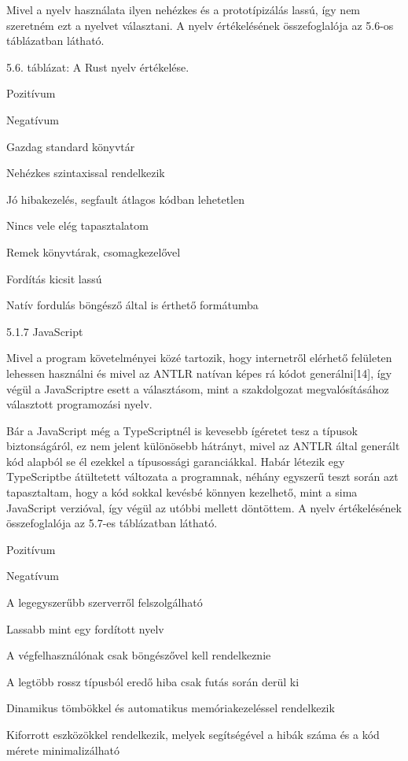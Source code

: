 Mivel a nyelv használata ilyen nehézkes és a prototípizálás lassú, így nem szeretném ezt a nyelvet választani. A nyelv értékelésének összefoglalója az 5.6-os táblázatban látható.

5.6. táblázat: A Rust nyelv értékelése.

Pozitívum

Negatívum

Gazdag standard könyvtár

Nehézkes szintaxissal rendelkezik

Jó hibakezelés, segfault átlagos kódban lehetetlen

Nincs vele elég tapasztalatom

Remek könyvtárak, csomagkezelővel

Fordítás kicsit lassú

Natív fordulás böngésző által is érthető formátumba





5.1.7 JavaScript

Mivel a program követelményei közé tartozik, hogy internetről elérhető felületen lehessen használni és mivel az ANTLR natívan képes rá kódot generálni[14], így végül a JavaScriptre esett a választásom, mint a szakdolgozat megvalósításához választott programozási nyelv.

Bár a JavaScript még a TypeScriptnél is kevesebb ígéretet tesz a típusok biztonságáról, ez nem jelent különösebb hátrányt, mivel az ANTLR által generált kód alapból se él ezekkel a típusossági garanciákkal. Habár létezik egy TypeScriptbe átültetett változata a programnak, néhány egyszerű teszt során azt tapasztaltam, hogy a kód sokkal kevésbé könnyen kezelhető, mint a sima JavaScript verzióval, így végül az utóbbi mellett döntöttem. A nyelv értékelésének összefoglalója az 5.7-es táblázatban látható.

Pozitívum

Negatívum

A legegyszerűbb szerverről felszolgálható

Lassabb mint egy fordított nyelv

A végfelhasználónak csak böngészővel kell rendelkeznie

A legtöbb rossz típusból eredő hiba csak futás során derül ki

Dinamikus tömbökkel és automatikus memóriakezeléssel rendelkezik

Kiforrott eszközökkel rendelkezik, melyek segítségével a hibák száma és a kód mérete minimalizálható

